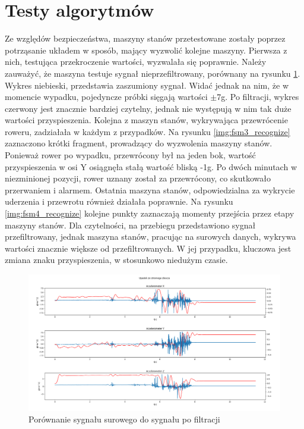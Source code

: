 \section{Testy algorytmów}
Ze względów bezpieczeństwa, maszyny stanów przetestowane zostały poprzez potrząsanie układem w sposób, mający wyzwolić kolejne maszyny. Pierwsza z nich, testująca przekroczenie wartości, wyzwalała się poprawnie. Należy zauważyć, że maszyna testuje sygnał nieprzefiltrowany, porównany na rysunku \ref{img:signal_comparsion}. Wykres niebieski, przedstawia zaszumiony sygnał. Widać jednak na nim, że w momencie wypadku, pojedyncze próbki sięgają wartości $\pm$7g. Po filtracji, wykres czerwony jest znacznie bardziej czytelny, jednak nie występują w nim tak duże wartości przyspieszenia.
\newline
Kolejna z maszyn stanów, wykrywająca przewrócenie roweru, zadziałała w każdym z przypadków. Na rysunku \ref{img:fsm3_recognize} zaznaczono krótki fragment, prowadzący do wyzwolenia maszyny stanów. Ponieważ rower po wypadku, przewrócony był na jeden bok, wartość przyspieszenia w osi Y osiągnęła stałą wartość bliską -1g. Po dwóch minutach w niezminionej pozycji, rower uznany został za przewrócony, co skutkowało przerwaniem i alarmem.
\newline
Ostatnia maszyna stanów, odpowiedzialna za wykrycie uderzenia  i przewrotu również działała poprawnie. Na rysunku \ref{img:fsm4_recognize} kolejne punkty zaznaczają momenty przejścia przez etapy maszyny stanów. Dla czytelności, na przebiegu przedstawiono sygnał przefiltrowany, jednak maszyna stanów, pracując na surowych danych, wykrywa wartości znacznie większe od przefiltrowanych. W jej przypadku, kluczowa jest zmiana znaku przyspieszenia, w stosunkowo niedużym czasie.


\begin{figure}[h]
    \centering
    \includegraphics[width=15cm]{Graphics/Before_and_after_filter.png}
    \caption{Porównanie sygnału surowego do sygnału po filtracji}
    \label{img:signal_comparsion}
\end{figure}

